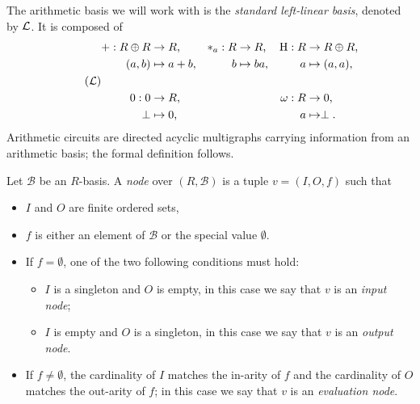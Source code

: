\ifafourps \pagebreak[1] \fi
{}  The arithmetic basis we will work with is
the \emph{standard left-linear
  basis}, denoted by $\mathcal{L}$.  It is composed of
\begin{equation}
  \label{eq:tbasis}
  \tag{$\Tbasis$}
  \begin{aligned}
    + : R\oplus R &\ra R\text{,}    & \rmul{a} : R &\ra R\text{,}     &  \hub : R &\ra R\oplus R\text{,}\\
      (a, b) &\mapsto a+b\text{,}   &           b &\mapsto ba\text{,} &         a &\mapsto (a,a)\text{,}\\ \\
    0 : 0 &\ra R\text{,}     &&& \omega : R &\ra 0\text{,} \\
     \bom &\mapsto 0\text{,} &&&          a &\mapsto \bom\text{.}
  \end{aligned}
\end{equation}
Arithmetic circuits are directed acyclic multigraphs carrying
information from an arithmetic basis; the formal definition follows.

\begin{definition}
  Let $\mathcal{B}$ be an $R$-basis. A \emph{node} over
  $(R,\mathcal{B})$ is a tuple $v=(I, O, f)$ such that
  \begin{itemize}
  \item $I$ and $O$ are finite ordered sets, 
  \item $f$ is either an element of $\mathcal{B}$ or the special value
    $\emptyset$.
  \item If $f=\emptyset$, one of the two following conditions must hold:
    \begin{itemize}
    \item $I$ is a singleton and $O$ is empty, in this case we say
      that $v$ is an \emph{input node};
    \item $I$ is empty and $O$ is a singleton, in this case we say
      that $v$ is an \emph{output node}.
    \end{itemize}
  \item If $f\ne\emptyset$, the cardinality of $I$ matches the
    in-arity of $f$ and the cardinality of $O$ matches the out-arity
    of $f$; in this case we say that $v$ is an
    \emph{evaluation node}.
  \end{itemize}
\end{definition}

